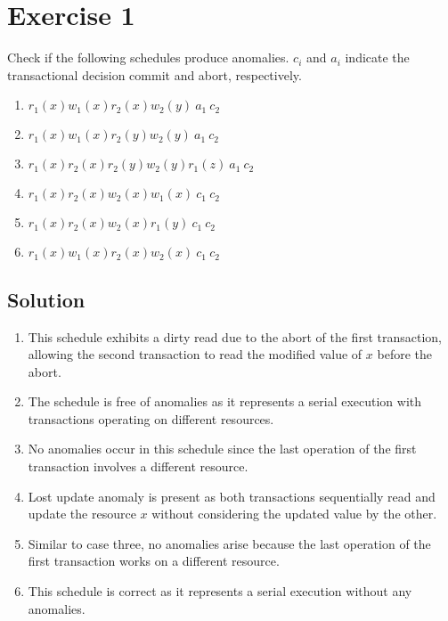 \section{Exercise 1}

Check if the following schedules produce anomalies. 
$c_i$ and $a_i$ indicate the transactional decision commit and abort, respectively.
\begin{enumerate}
    \item $r_1(x) w_1(x) r_2(x) w_2(y)\:a_1\:c_2$
    \item $r_1(x) w_1(x) r_2(y) w_2(y)\:a_1\:c_2$
    \item $r_1(x) r_2(x) r_2(y) w_2(y) r_1(z)\:a_1\:c_2$
    \item $r_1(x) r_2(x) w_2(x) w_1(x)\:c_1\:c_2$
    \item $r_1(x) r_2(x) w_2(x) r_1(y)\:c_1\:c_2$
    \item $r_1(x) w_1(x) r_2(x) w_2(x)\:c_1\:c_2$
\end{enumerate}

\subsection*{Solution}
\begin{enumerate}
    \item This schedule exhibits a dirty read due to the abort of the first transaction, allowing the second transaction to read the modified value of $x$ before the abort.
    \item The schedule is free of anomalies as it represents a serial execution with transactions operating on different resources.
    \item No anomalies occur in this schedule since the last operation of the first transaction involves a different resource.
    \item Lost update anomaly is present as both transactions sequentially read and update the resource $x$ without considering the updated value by the other.
    \item Similar to case three, no anomalies arise because the last operation of the first transaction works on a different resource.
    \item This schedule is correct as it represents a serial execution without any anomalies.
\end{enumerate}